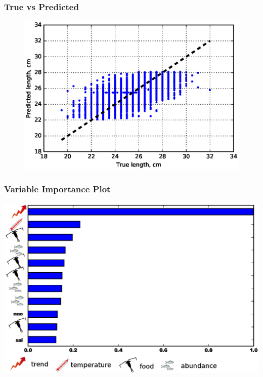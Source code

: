 \documentclass{beamer}
\begin{document}
\begin{frame}
    \frametitle{True vs Predicted}
\begin{figure}
    \centering
\includegraphics[scale=0.75]{../fig/true-pred-present}
\end{figure}
\end{frame}




\begin{frame}
    \frametitle{Variable Importance Plot}
\includegraphics[scale=0.55]{../fig/featureCS-present}
\end{frame}
\end{document}
